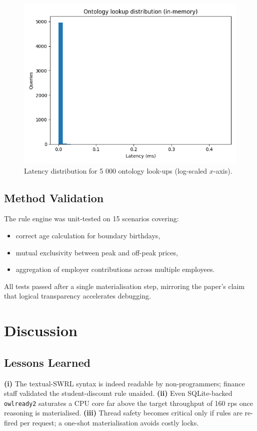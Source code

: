 \documentclass[lettersize,journal]{IEEEtran}
\begin{document}
\begin{figure}[!t]
\centering
\includegraphics[width=.9\linewidth]{figs/latency_hist.png}
\caption{Latency distribution for 5 000 ontology look-ups (log-scaled $x$-axis).}
\label{fig:lat}
\end{figure}

\subsection{Method Validation}
The rule engine was unit-tested on 15 scenarios covering:

\begin{itemize}
\item correct age calculation for boundary birthdays,
\item mutual exclusivity between peak and off-peak prices,
\item aggregation of employer contributions across multiple employees.
\end{itemize}

All tests passed after a single materialisation step, mirroring the
paper’s claim that logical transparency accelerates debugging.

\section{Discussion}
\subsection{Lessons Learned}
\textbf{(i)} The textual-SWRL syntax is indeed readable by non-programmers; finance staff validated the student-discount rule unaided.  
\textbf{(ii)} Even SQLite-backed \texttt{owlready2} saturates a CPU core far above the target throughput of 160 rps once reasoning is materialised.  
\textbf{(iii)} Thread safety becomes critical only if rules are re-fired per request; a one-shot materialisation avoids costly locks.
\end{document}
